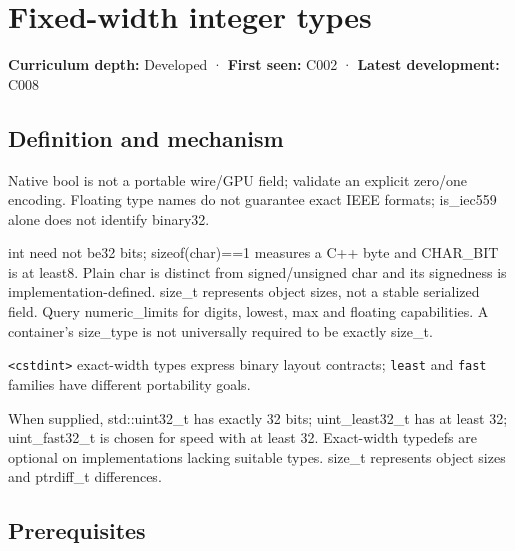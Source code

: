\hypertarget{appendix-cc04044b5782}{}\label{referencestart:appendix-cc04044b5782}
\section{Fixed-width integer types}\label{appendix-cc04044b5782-fixed-width-integer-types}

\hypertarget{appendix-cc04044b5782-fixed-width-integer-types}{}

\textbf{Curriculum depth:} Developed · \textbf{First seen:} C002 · \textbf{Latest development:} C008

\begin{allmightroledefinition}

\subsection{Definition and mechanism}\label{appendix-cc04044b5782-definition-and-mechanism}

\hypertarget{appendix-cc04044b5782-definition-and-mechanism}{}

Native bool is not a portable wire/GPU field; validate an explicit zero/one encoding. Floating type names do not guarantee exact IEEE formats; is\_iec559 alone does not identify binary32.

\end{allmightroledefinition}

int need not be32 bits; sizeof(char)==1 measures a C++ byte and CHAR\_BIT is at least8. Plain char is distinct from signed/unsigned char and its signedness is implementation-defined. size\_t represents object sizes, not a stable serialized field. Query numeric\_limits for digits, lowest, max and floating capabilities. A container's size\_type is not universally required to be exactly size\_t.

\texttt{\textless{}cstdint\textgreater{}} exact-width types express binary layout contracts; \texttt{least} and \texttt{fast} families have different portability goals.

When supplied, std::uint32\_t has exactly 32 bits; uint\_least32\_t has at least 32; uint\_fast32\_t is chosen for speed with at least 32. Exact-width typedefs are optional on implementations lacking suitable types. size\_t represents object sizes and ptrdiff\_t differences.

\subsection{Prerequisites}\label{appendix-cc04044b5782-prerequisites}


